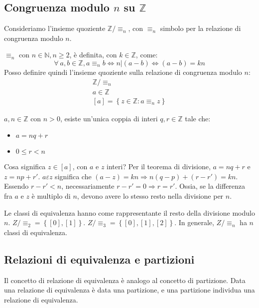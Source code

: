 \subsection{Congruenza modulo $n$ su $\mathbb{Z}$}

Consideriamo l'insieme quoziente $\mathbb{Z} / \equiv_{n}$, con $\equiv_{n} $ simbolo per la relazione di congruenza modulo $n$.

$\equiv_{n}$ con $n \in \mathbb{N}, n \ge 2$, \`e definita, con $ k \in \mathbb{Z}$, come:
\[
\forall \ a, b \in \mathbb{Z}, a \equiv_{n} b \Leftrightarrow n | (a - b) \Leftrightarrow (a - b) = k n 
\]
Posso definire quindi l'insieme quoziente sulla relazione di congruenza modulo $n$:
\begin{gather*}
\mathbb{Z} / \equiv_{n} \\
a \in \mathbb{Z} \\
[a] = \left \{ z \in \mathbb{Z} : a \equiv_{n} z \right \}
\end{gather*}

\begin{theorem}
$a, n \in \mathbb{Z}$ con $n > 0$, esiste un'unica coppia di interi $q, r \in \mathbb{Z}$ tale che:
\begin{itemize}
  \item $a = n q + r$
  \item $0 \le r < n$
\end{itemize}
\end{theorem}
Cosa significa $z \in [a]$, con $a$ e $z$ interi? Per il teorema di divisione, $a = n q + r$ e $z = n p + r'$. $a \varepsilon z $ significa che $ (a - z) = k n \Rightarrow n (q - p) + (r - r') = kn $. Essendo $r - r' < n$, necessariamente $r - r' = 0 \Rightarrow r = r'$. Ossia, se la differenza fra $a$ e $z$ \`e multiplo di $n$, devono avere lo stesso resto nella divisione per $n$.

Le classi di equivalenza hanno come rappresentante il resto della divisione modulo $n$. $Z / \equiv_{2} = \left \{ [0], [1] \right \}$. $Z / \equiv_{3} = \left \{ [0], [1], [2] \right \}$. In generale, $Z / \equiv_{n}$ ha $n$ classi di equivalenza.

\subsection{Relazioni di equivalenza e partizioni}

Il concetto di relazione di equivalenza \`e analogo al concetto di partizione. Data una relazione di equivalenza \`e data una partizione, e una partizione individua una relazione di equivalenza.

